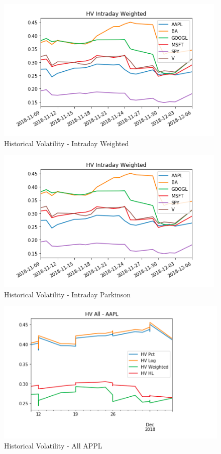 \documentclass{article}
\begin{document}
\begin{figure}[h!]
\includegraphics[width =\textwidth]{images/HV/HV_W.png}
\caption{Historical Volatility - Intraday Weighted}
\centering
\end{figure}
\begin{figure}[h!]
\includegraphics[width =\textwidth]{images/HV/HV_W.png}
\caption{Historical Volatility - Intraday Parkinson}
\centering
\end{figure}
\begin{figure}[h!]
\includegraphics[width =\textwidth]{images/HV/HV-ALL-AAPL.png}
\caption{Historical Volatility - All APPL}
\centering
\end{figure}
\end{document}
